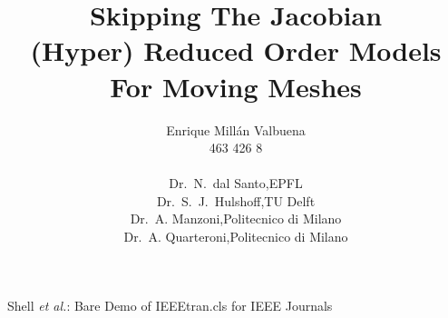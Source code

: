 \documentclass[a4paper, technote,compsoc]{IEEEtran}
\begin{document}


\onecolumn

\title{Skipping The Jacobian \\[5mm] \large{(Hyper) Reduced Order Models For Moving Meshes}}

\author{Enrique Millán Valbuena \\ \normalsize{463 426 8}
\\[5mm]

\begin{tabular}{ll}
    Dr.\ N.\ dal Santo,    & EPFL  \\
    Dr.\ S.\ J.\ Hulshoff, & TU Delft \\
    Dr.\ A. Manzoni,       & Politecnico di Milano \\
    Dr.\ A. Quarteroni,    & Politecnico di Milano \\[5mm]
\end{tabular}
}%
        
{Shell \MakeLowercase{\textit{et al.}}: Bare Demo of IEEEtran.cls for IEEE Journals}

\maketitle
\end{document}
